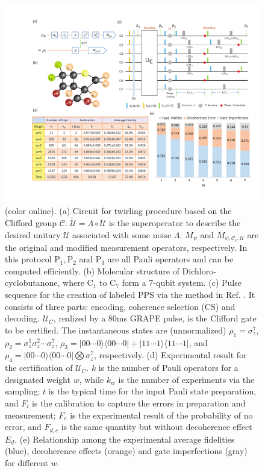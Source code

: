 \documentclass[prl,twocolumn,showpacs]{revtex4-1}
\newcommand{\bra}[1]{\langle #1|}
\newcommand{\ket}[1]{|#1\rangle}
\begin{document}
\begin{figure}[htb]
\begin{center}
\includegraphics[width=2\columnwidth]{everything2.pdf}
\end{center}
\setlength{\abovecaptionskip}{-0.35cm}
\caption{\footnotesize{(color online). (a) Circuit for twirling procedure based on the Clifford group $\mathcal{C}$. $\tilde{\mathcal{U}} = \Lambda \circ \mathcal{U}$ is the superoperator to describe the desired unitary $\mathcal{U}$ associated with some noise $\Lambda$. $M_\psi$ and $M_{\psi, \mathcal{C}_i, \mathcal{U}}$ are the original and modified measurement operators, respectively. In this protocol $\text{P}_1, \text{P}_2$ and $\text{P}_3$ are all Pauli operators and can be computed efficiently. (b) Molecular structure of Dichloro-cyclobutanone, where C$_1$ to C$_7$ form a 7-qubit system. (c) Pulse sequence for the creation of labeled PPS via the method in Ref. \cite{Knill2000}. It consists of three parts: encoding, coherence selection (CS) and decoding. $\mathcal{U}_{C}$, realized by a 80ms GRAPE pulse, is the Clifford gate to be certified. The instantaneous states are (unnormalized) $\rho_1 = \sigma^7_z$,  $\rho_2 = \sigma^1_z\sigma^2_z\cdots \sigma^7_z$, $\rho_3 = \ket{00\cdots 0}\bra{00\cdots 0}+\ket{11\cdots 1}\bra{11\cdots 1}$, and $\rho_4 =  \ket{00\cdots 0}\bra{00\cdots 0} \bigotimes \sigma^7_z$, respectively. (d) Experimental result for the certification of $\mathcal{U}_{C}$. $k$ is the number of Pauli operators for a designated weight $w$, while $k_w$ is the number of experiments via the sampling; $t$ is the typical time for the input Pauli state preparation, and $F_i$ is the calibration to capture the errors in preparation and measurement; $F_e$ is the experimental result of the probability of no error, and $F_{d,c}$ is the same quantity but without decoherence effect $E_d$. (e) Relationship among the experimental average fidelities (blue), decoherence effects (orange) and gate imperfections (gray) for different $w$.}}\label{everything}
\end{figure}
\end{document}
